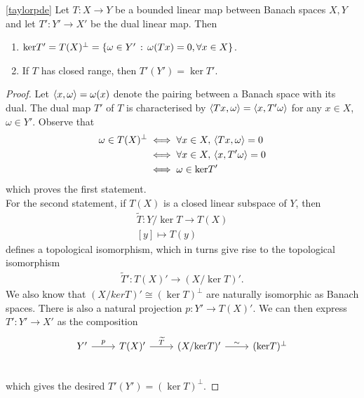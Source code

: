 \documentclass[12pt]{article}
\begin{document}
\begin{flemma} \ref{taylorpde}
    Let $T: X \to Y$ be a bounded linear map between Banach spaces $X, Y$ and let $T' : Y' \to X'$ be the dual linear map. Then
    \begin{enumerate}
        \item $\ker T' = T(X)^\perp = \set{\omega \in Y' \wh \omega(Tx) = 0, \forall x \in X}$. 
        \item If $T$ has closed range, then $T'(Y')  =\ker T'$.  
    \end{enumerate}
\end{flemma}
\begin{proof}
    Let $\inprod[x, \omega] = \omega(x)$ denote the pairing between a Banach space with its dual. The dual map $T'$ of $T$ is characterised by $\inprod[Tx, \omega] = \inprod[x, T'\omega]$ for any $x \in X$, $\omega \in Y'$. Observe that 
    \begin{align*}
    \omega \in T(X)^\perp 
    & \iff \forall x \in X, \, \inprod[Tx, \omega] = 0 \\
    & \iff \forall x \in X, \, \inprod[x, T' \omega] = 0 \\
    & \iff \omega \in \ker T'
    \end{align*}
    which proves the first statement. \\
    
    For the second statement, if $T(X)$ is a closed linear subspace of $Y$, then
    \begin{align*}
    \widetilde{T} : Y / \ker T \to T(X)\\
    [y] \mapsto T(y)
    \end{align*}
    defines a topological isomorphism, which in turns give rise to the topological isomorphism 
    \begin{align*}
    \widetilde{T}' : T(X)' \to (X / \ker T)'.
    \end{align*}
    We also know that $(X/ker T)' \cong (\ker T)^\perp$ are naturally isomorphic as Banach spaces. There is also a natural projection $p : Y' \to T(X)'$. We can then express $T': Y' \to X'$ as the composition
    \begin{equation*}
    \begin{tikzcd}
    Y' \ar[r, "p"] & T(X)' \ar[r, "\widetilde{T}"] & (X / \ker T)' \ar[r, "\sim"]& (\ker T)^\perp \\
    \end{tikzcd}
    \end{equation*}
    which gives the desired $T'(Y') = (\ker T)^\perp$. 
    
\end{proof}
\end{document}
